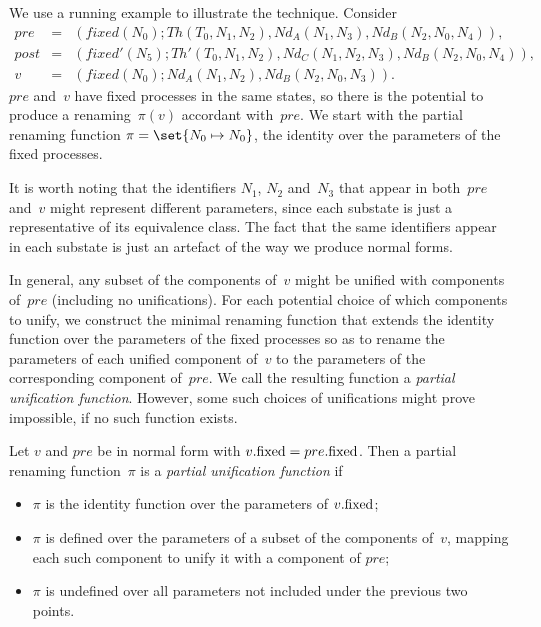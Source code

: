 
\begin{example}
We use a running example to illustrate the technique.  Consider
\begin{eqnarray*}
pre & = &
   (fixed(N_0); Th(T_0, N_1, N_2), Nd_A(N_1, N_3), Nd_B(N_2, N_0, N_4)), 
\\
post & = & 
  (fixed'(N_5); Th'(T_0, N_1, N_2), Nd_C(N_1, N_2, N_3), Nd_B(N_2, N_0, N_4)) ,
\\
v & = & 
  (fixed(N_0); Nd_A(N_1, N_2), Nd_B(N_2, N_0, N_3)).
\end{eqnarray*}
%
$pre$ and~$v$ have fixed processes in the same states, so there is the
potential to produce a renaming~$\pi(v)$ accordant with~$pre$.  We start with
the partial renaming function $\pi = \set{N_0 \mapsto N_0}$, the identity over
the parameters of the fixed processes.

It is worth noting that the identifiers $N_1$, $N_2$ and~$N_3$ that appear in
both~$pre$ and~$v$ might represent different parameters, since each substate
is just a representative of its equivalence class.  The fact that the same
identifiers appear in each substate is just an artefact of the way we produce
normal forms.
\end{example}


In general, any subset of the components of~$v$ might be unified with
components of~$pre$ (including no unifications).  For each potential choice of
which components to unify, we construct the minimal renaming function that
extends the identity function over the parameters of the fixed processes so as
to rename the parameters of each unified component of~$v$ to the parameters of
the corresponding component of~$pre$.  We call the resulting function a
\emph{partial unification function}.  However, some such choices of
unifications might prove impossible, if no such function exists.
%
\begin{definition}
Let $v$ and $pre$ be in normal form with $v.\mathrm{fixed} = pre.\mathrm{fixed}$.  Then a
partial renaming function~$\pi$ is a \emph{partial unification function} if
\begin{itemize}
\item $\pi$ is the identity function over the parameters of $v.\mathrm{fixed}$;

\item $\pi$ is defined over the parameters of a subset of the components
  of~$v$, mapping each such component to unify it with a component of $pre$;

\item $\pi$ is undefined over all parameters not included under the previous
  two points.
\end{itemize}
\end{definition}


